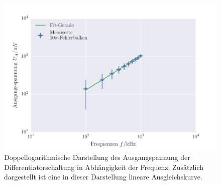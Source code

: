 \FloatBarrier
\begin{figure}[!h]
\centering
\includegraphics[scale=1]{../Grafiken/Differentiator_Frequenz.pdf}
\caption{Doppellogarithmische Darstellung des Ausgangspannung der Differentiatorschaltung
	in Abhängigkeit der Frequenz. Zusätzlich dargestellt ist eine in dieser Darstellung
	lineare Ausgleichskurve.\label{fig:differentiator_frequenz}}
\end{figure}
\FloatBarrier